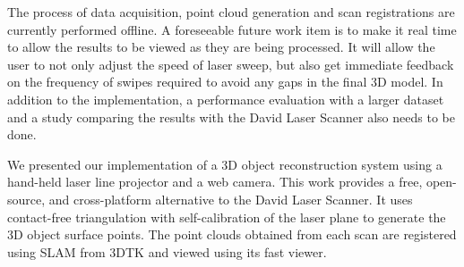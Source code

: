 The process of data acquisition, point cloud generation and scan registrations
are currently performed offline. A foreseeable future work item is to make it
real time to allow the results to be viewed as they are being processed. It
will allow the user to not only adjust the speed of laser sweep, but also get
immediate feedback on the frequency of swipes required to avoid any gaps in the
final 3D model. In addition to the implementation, a performance evaluation
with a larger dataset and a study comparing the results with the David Laser
Scanner also needs to be done.

We presented our implementation of a 3D object reconstruction system using a
hand-held laser line projector and a web camera.  This work provides a free,
open-source, and cross-platform alternative to the David Laser Scanner. It
uses contact-free triangulation with self-calibration of the laser plane to
generate the 3D object surface points. The point clouds obtained from each
scan are registered using \ac{SLAM} from \ac{3DTK} and viewed using its fast
viewer.
